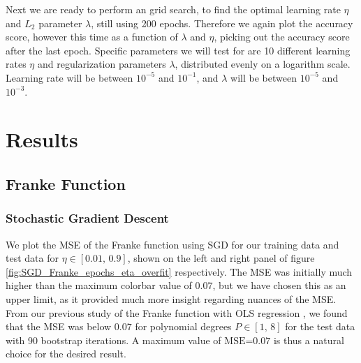 \documentclass[12pt]{extarticle}
\begin{document}
Next we are ready to perform an grid search, to find the optimal learning rate $\eta$ and $L_2$ parameter $\lambda$, still using 200 epochs. Therefore we again plot the accuracy score, however this time as a function of $\lambda$ and $\eta$, picking out the accuracy score after the last epoch. Specific parameters we will test for are 10 different learning rates $\eta$ and regularization parameters $\lambda$, distributed evenly on a logarithm scale. Learning rate will be between $10^{-5}$ and $10^{-1}$, and $\lambda$ will be between $10^{-5}$ and $10^{-3}$.

\section{Results}

\subsection{Franke Function}
\subsubsection{Stochastic Gradient Descent}

We plot the MSE of the Franke function using SGD for our training data and test data for $\eta\in[0.01,\,0.9]$, shown on the left and right panel of figure \ref{fig:SGD_Franke_epochs_eta_overfit} respectively. The MSE was initially much higher than the maximum colorbar value of $0.07$, but we have chosen this as an upper limit, as it provided much more insight regarding nuances of the MSE. From our previous study of the Franke function with OLS regression \cite{project1}, we found that the MSE was below $0.07$ for polynomial degrees $P\in[1,\,8]$ for the test data with 90 bootstrap iterations. A maximum value of $\text{MSE=0.07}$ is thus a natural choice for the desired result.
\end{document}

